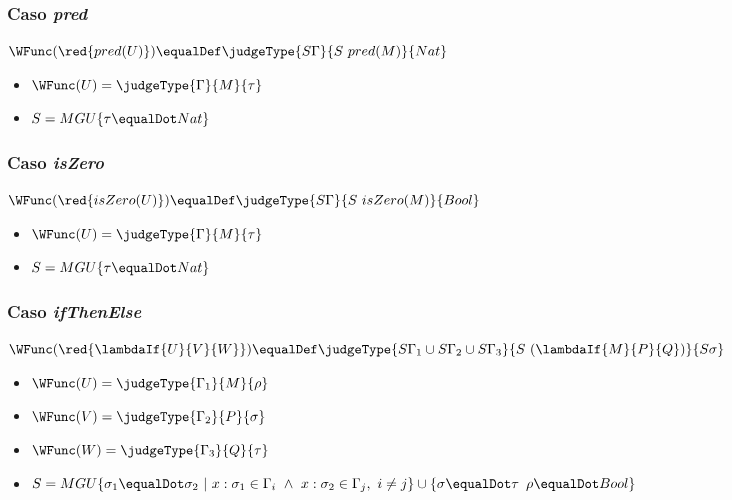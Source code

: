 \subsubsection{Caso \texorpdfstring{\textit{pred}}{pred}}
$\WFunc(\red{pred(U)}) \equalDef \judgeType{S\Gamma}{S~pred(M)}{Nat}$
\begin{centrado}
	\begin{itemize}
		\item $\WFunc(U) = \judgeType{\Gamma}{M}{\tau}$
		\item $S = MGU\{\tau\equalDot Nat\}$
	\end{itemize}
\end{centrado}

\subsubsection{Caso \texorpdfstring{\textit{isZero}}{isZero}}
$\WFunc(\red{isZero(U)}) \equalDef \judgeType{S\Gamma}{S~isZero(M)}{Bool}$
\begin{centrado}
	\begin{itemize}
		\item $\WFunc(U) = \judgeType{\Gamma}{M}{\tau}$
		\item $S = MGU\{\tau\equalDot Nat\}$
	\end{itemize}
\end{centrado}

\subsubsection{Caso \texorpdfstring{\textit{ifThenElse}}{ifThenElse}}
$\WFunc(\red{\lambdaIf{U}{V}{W}}) \equalDef \judgeType{S\Gamma_1\cup S\Gamma_2\cup S\Gamma_3}{S~(\lambdaIf{M}{P}{Q})}{S\sigma}$
\begin{centrado}
	\begin{itemize}
		\item $\WFunc(U) = \judgeType{\Gamma_1}{M}{\rho}$
		\item $\WFunc(V) = \judgeType{\Gamma_2}{P}{\sigma}$
		\item $\WFunc(W) = \judgeType{\Gamma_3}{Q}{\tau}$
		\item $S = MGU\{\sigma_1\equalDot \sigma_2~|~x:\sigma_1\in\Gamma_i~\land~x:\sigma_2\in\Gamma_j,~i\neq j\}\cup\{\sigma\equalDot\tau\,~\rho\equalDot Bool\}$
	\end{itemize}
\end{centrado}

